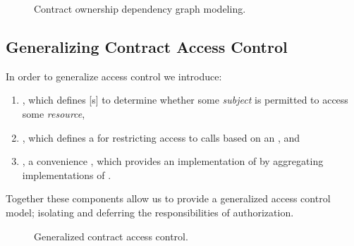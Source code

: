 \begin{figure}[H]
  \centering
  \caption{Contract ownership dependency graph modeling.}\label{fig:ownership}
\end{figure}







\subsection{Generalizing Contract Access Control}

In order to generalize  access control we introduce:

\begin{enumerate}
  \item {}, which defines [s] to determine
    whether some \emph{subject} is permitted to access some \emph{resource},
  \item {}, which defines a  for
    restricting access to  calls based on an , and
  \item {}, a convenience , which provides an
    implementation of  by aggregating
    implementations of .
\end{enumerate}

Together these components allow us to provide a generalized access control
model; isolating and deferring the responsibilities of
authorization.\footnotemark{}


\begin{figure}[H]
  \centering
  \caption{Generalized contract access control.}%
\end{figure}

